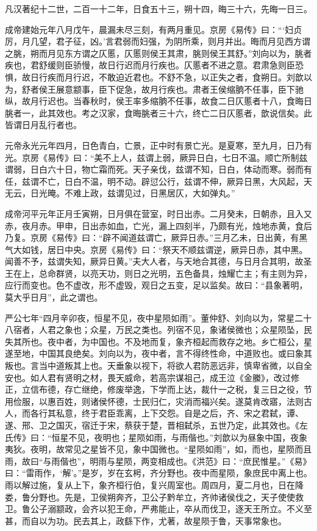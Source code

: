 \documentclass[12pt,UTF8]{ctexbook}
\begin{document}
凡汉著纪十二世，二百一十二年，日食五十三，朔十四，晦三十六，先晦一日三。



成帝建始元年八月戊午，晨漏未尽三刻，有两月重见。京房《易传》曰：“‘妇贞厉，月几望，君子征，凶。’言君弱而妇强，为阴所乘，则月并出。晦而月见西方谓之朓，朔而月见东方谓之仄慝，仄慝则侯王其肃，朓则侯王其舒。”刘向以为，朓者疾也，君舒缓则臣骄慢，故日行迟而月行疾也。仄慝者不进之意。君肃急则臣恐惧，故日行疾而月行迟，不敢迫近君也。不舒不急，以正失之者，食朔日。刘歆以为，舒者侯王展意颛事，臣下促急，故月行疾也。肃者王侯缩朒不任事，臣下驰纵，故月行迟也。当春秋时，侯王率多缩朒不任事，故食二日仄慝者十八，食晦日朓者一，此其效也。考之汉家，食晦朓者三十六，终亡二日仄慝者，歆说信矣。此皆谓日月乱行者也。



元帝永光元年四月，日色青白，亡景，正中时有景亡光。是夏寒，至九月，日乃有光。京房《易传》曰：“美不上人，兹谓上弱，厥异日白，七日不温。顺亡所制兹谓弱，日白六十日，物亡霜而死。天子亲伐，兹谓不知，日白，体动而寒。弱而有任，兹谓不亡，日白不温，明不动。辟愆公行，兹谓不伸，厥异日黑，大风起，天无云，日光晻。不难上政，兹谓见过，日黑居仄，大如弹丸。”



成帝河平元年正月壬寅朔，日月俱在营室，时日出赤。二月癸未，日朝赤，且入又赤，夜月赤。甲申，日出赤如血，亡光，漏上四刻半，乃颇有光，烛地赤黄，食后乃复。京房《易传》曰：“辟不闻道兹谓亡，厥异日赤。”三月乙未，日出黄，有黑气大如钱，居日中央。京房《易传》曰：“祭天不顺兹谓逆，厥异日赤，其中黑。闻善不予，兹谓失知，厥异日黄。”夫大人者，与天地合其德，与日月合其明，故圣王在上，总命群贤，以亮天功，则日之光明，五色备具，烛耀亡主；有主则为异，应行而变也。色不虚改，形不虚毁，观日之五变，足以监矣。故曰：“县象著明，莫大乎日月”，此之谓也。



严公七年“四月辛卯夜，恒星不见，夜中星陨如雨”。董仲舒、刘向以为，常星二十八宿者，人君之象也；众星，万民之类也。列宿不见，象诸侯微也；众星陨坠，民失其所也。夜中者，为中国也。不及地而复，象齐桓起而救存之地。乡亡桓公，星遂至地，中国其良绝矣。刘向以为，夜中者，言不得终性命，中道败也。或曰象其叛也。言当中道叛其上也。天垂象以视下，将欲人君防恶远非，慎卑省微，以自全安也。如人君有贤明之材，畏天威命，若高宗谋祖己，成王泣《金縢》，改过修正，立信布德，存亡继绝，修废举逸，下学而上达，裁什一之税，复三日之役，节用俭服，以惠百姓，则诸侯怀德，士民归仁，灾消而福兴矣。遂莫肯改寤，法则古人，而各行其私意，终于君臣乖离，上下交怨。自是之后，齐、宋之君弑，谭、遂、邢、卫之国灭，宿迁于宋，蔡获于楚，晋相弑杀，五世乃定，此其效也。《左氏传》曰：“恒星不见，夜明也；星陨如雨，与雨偕也。”刘歆以为昼象中国，夜象夷狄。夜明，故常见之星皆不见，象中国微也。“星陨如雨”，如，而也，星陨而且雨，故曰“与雨偕也”，明雨与星陨，两变相成也。《洪范》曰：“庶民惟星。”《易》曰：“雷雨作，‘解’。”是岁，岁在玄枵，齐分野也。夜中而星陨，象庶民中离上也。雨以解过施，复从上下，象齐桓行伯，复兴周室也。周四月，夏二月也，日在降娄，鲁分野也。先是，卫侯朔奔齐，卫公子黔牟立，齐帅诸侯伐之，天子使使救卫。鲁公子溺颛政，会齐以犯王命，严弗能止，卒从而伐卫，逐天王所立。不义至甚，而自以为功。民去其上，政繇下作，尤著，故星陨于鲁，天事常象也。
\end{document}
